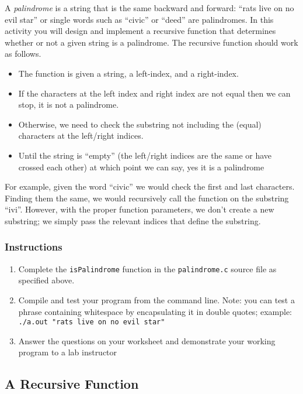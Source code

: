 \documentclass[12pt]{scrartcl}
\begin{document}
A \emph{palindrome} is a string that is the same backward and 
forward: ``rats live on no evil star'' or single words such as ``civic'' 
or ``deed'' are palindromes.  In this activity you will design and 
implement a recursive function that determines whether or not 
a given string is a palindrome.  The recursive function should 
work as follows.  
\begin{itemize}
  \item The function is given a string, a left-index, and a right-index.
  \item If the characters at the left index and right index are not 
	equal then we can stop, it is not a palindrome.
  \item Otherwise, we need to check the substring not including the 
	(equal) characters at the left/right indices.
  \item Until the string is ``empty'' (the left/right indices are the same 
	or have crossed each other) at which point we can say, yes it 
	is a palindrome
\end{itemize}

For example, given the word ``civic'' we would check the first and 
last characters.  Finding them the same, we would recursively call 
the function on the substring ``ivi''.  However, with the proper function 
parameters, we don't create a new substring; we simply pass the 
relevant indices that define the substring.

\subsubsection*{Instructions}

\begin{enumerate}
  \item Complete the \texttt{isPalindrome} function in the 
	\texttt{palindrome.c} source file as specified above.
  \item Compile and test your program from the command line.  
	Note: you can test a phrase containing whitespace by encapsulating 
	it in double quotes; example: \\
	\texttt{./a.out "rats live on no evil star"}
  \item Answer the questions on your worksheet and demonstrate your 
  	working program to a lab instructor
\end{enumerate}
	
\subsection{A Recursive Function}
\end{document}
